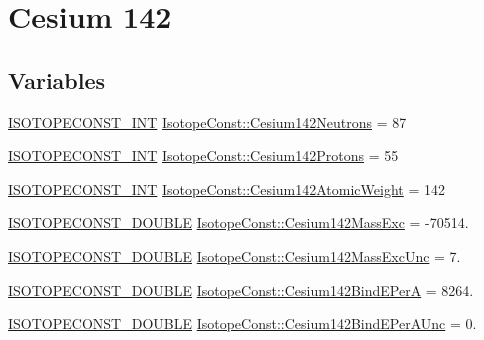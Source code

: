 \hypertarget{group___isotope_const-_cesium-_cs142}{}\section{Cesium 142}
\label{group___isotope_const-_cesium-_cs142}
\subsection*{Variables}
\begin{DoxyCompactItemize}
\item 
\mbox{\hyperlink{group___isotope_const-_macros_ga5f18360b3e99483a35c32d789e62621c}{I\+S\+O\+T\+O\+P\+E\+C\+O\+N\+S\+T\+\_\+\+I\+NT}} \mbox{\hyperlink{group___isotope_const-_cesium-_cs142_ga214005c4a0903349e7e71f9b1d52da51}{Isotope\+Const\+::\+Cesium142\+Neutrons}} = 87
\item 
\mbox{\hyperlink{group___isotope_const-_macros_ga5f18360b3e99483a35c32d789e62621c}{I\+S\+O\+T\+O\+P\+E\+C\+O\+N\+S\+T\+\_\+\+I\+NT}} \mbox{\hyperlink{group___isotope_const-_cesium-_cs142_gae4777c21348c4d0babbb7c4fd0a91423}{Isotope\+Const\+::\+Cesium142\+Protons}} = 55
\item 
\mbox{\hyperlink{group___isotope_const-_macros_ga5f18360b3e99483a35c32d789e62621c}{I\+S\+O\+T\+O\+P\+E\+C\+O\+N\+S\+T\+\_\+\+I\+NT}} \mbox{\hyperlink{group___isotope_const-_cesium-_cs142_gaa64c6129e2adc702f5ad8429b3ea81ab}{Isotope\+Const\+::\+Cesium142\+Atomic\+Weight}} = 142
\item 
\mbox{\hyperlink{group___isotope_const-_macros_ga8f45a7272ce02c0b4c65c44636ed719a}{I\+S\+O\+T\+O\+P\+E\+C\+O\+N\+S\+T\+\_\+\+D\+O\+U\+B\+LE}} \mbox{\hyperlink{group___isotope_const-_cesium-_cs142_ga474b974a115b0b276163d383e27103f6}{Isotope\+Const\+::\+Cesium142\+Mass\+Exc}} = -\/70514.
\item 
\mbox{\hyperlink{group___isotope_const-_macros_ga8f45a7272ce02c0b4c65c44636ed719a}{I\+S\+O\+T\+O\+P\+E\+C\+O\+N\+S\+T\+\_\+\+D\+O\+U\+B\+LE}} \mbox{\hyperlink{group___isotope_const-_cesium-_cs142_ga0ae91a7b9cb70c3e973c9a8a1bce6a77}{Isotope\+Const\+::\+Cesium142\+Mass\+Exc\+Unc}} = 7.
\item 
\mbox{\hyperlink{group___isotope_const-_macros_ga8f45a7272ce02c0b4c65c44636ed719a}{I\+S\+O\+T\+O\+P\+E\+C\+O\+N\+S\+T\+\_\+\+D\+O\+U\+B\+LE}} \mbox{\hyperlink{group___isotope_const-_cesium-_cs142_ga01becb4122c66bac16a83f84de6bc8e5}{Isotope\+Const\+::\+Cesium142\+Bind\+E\+PerA}} = 8264.
\item 
\mbox{\hyperlink{group___isotope_const-_macros_ga8f45a7272ce02c0b4c65c44636ed719a}{I\+S\+O\+T\+O\+P\+E\+C\+O\+N\+S\+T\+\_\+\+D\+O\+U\+B\+LE}} \mbox{\hyperlink{group___isotope_const-_cesium-_cs142_ga39d360880a2442df949deb62abb577f1}{Isotope\+Const\+::\+Cesium142\+Bind\+E\+Per\+A\+Unc}} = 0.

\end{DoxyCompactItemize}

